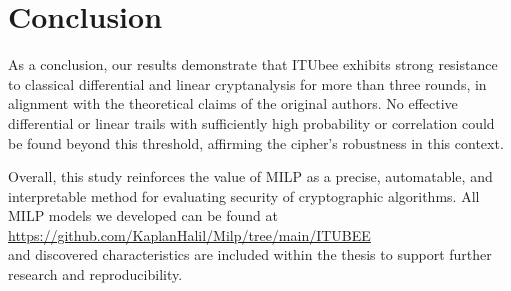 \section{Conclusion}
As a conclusion, our results demonstrate that ITUbee exhibits strong resistance to classical differential and linear cryptanalysis for more than three rounds, in alignment with the theoretical claims of the original authors. No effective differential or linear trails with sufficiently high probability or correlation could be found beyond this threshold, affirming the cipher’s robustness in this context.



Overall, this study reinforces the value of MILP as a precise, automatable, and interpretable method for evaluating security of  cryptographic algorithms. All MILP models we developed can be found at \\
\url{https://github.com/KaplanHalil/Milp/tree/main/ITUBEE} \\
and discovered characteristics are included within the thesis  to support further research and reproducibility.